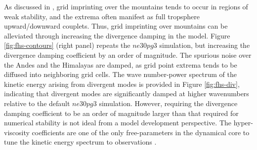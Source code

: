 \documentclass{agujournal}
\begin{document}
As discussed in \cite{HL2018MWR}, grid imprinting over the mountains tends to occur in regions of weak stability, and the extrema often  manifest as full tropsphere upward/downward couplets. Thus, grid imprinting over mountains can be alleviated through increasing the divergence damping in the model. Figure \ref{fig:fhs-contours} (right panel) repeats the $ne30pg3$ simulation, but increasing the divergence damping coefficient by an order of magnitude. The spurious noise over the Andes and the Himalayas are damped, as grid point extrema tends to be diffused into neighboring grid cells. The wave number-power spectrum of the kinetic energy arising from divergent modes is provided in Figure \ref{fig:fhs-div}, indicating that divergent modes are significantly damped at higher wavenumbers relative to the default $ne30pg3$ simulation. However, requiring the divergence damping coefficient to be an order of magnitude larger than that required for numerical stability is not ideal from a model development perspective. The hyper-viscosity coefficients are one of the only free-parameters in the dynamical core to tune the kinetic energy spectrum to observations \citep{SPKS2014JAS,LetAl2018JAMES}.
\end{document}
